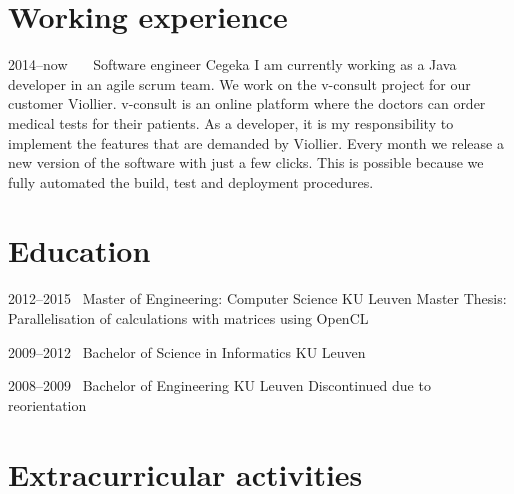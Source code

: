 \documentclass[a4paper]{friggeri-cv} %
\begin{document}
\section{Working experience}
\begin{entrylist}
\entry
{2014--now~~~}
{Software engineer}
{Cegeka}
{I am currently working as a Java developer in an agile scrum team. We work on the v-consult project for our customer Viollier. v-consult is an online platform where the doctors can order medical tests for their patients.
As a developer, it is my responsibility to implement the features that are demanded by Viollier. Every month we release a new version of the software with just a few clicks.
This is possible because we fully automated the build, test and deployment procedures.}

\end{entrylist}

\section{Education}

\begin{entrylist}
\entry
{2012--2015~}
{Master of Engineering: Computer Science}
{KU Leuven}
{Master Thesis: Parallelisation of calculations with matrices using OpenCL}

\entry
{2009--2012~}
{Bachelor of Science in Informatics}
{KU Leuven}
{~}

\entry
{2008--2009~}
{Bachelor of Engineering}
{KU Leuven}
{Discontinued due to reorientation}
\end{entrylist}



\section{Extracurricular activities}
\end{document}
